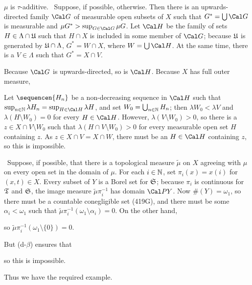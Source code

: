 {\medskip

 $\mu$ is $\tau$-additive.   \Prf\Quer\ Suppose, if
possible, otherwise.   Then there is an upwards-directed family $\Cal G$
of measurable open subsets of $X$ such that $G^*=\bigcup\Cal G$ is
measurable and $\mu G^*>\sup_{G\in\Cal G}\mu G$.   Let $\Cal H$ be the
family of sets $H\in\Lambda\cap\frak U$ such that $H\cap X$ is
included in some member of $\Cal G$;  because $\frak U$ is generated by
$\frak U\cap\Lambda$, $G^*=W\cap X$, where $W=\bigcup\Cal H$.
At the same time, there is a $V\in\Lambda$ such that $G^*=X\cap V$.

Because
$\Cal G$ is upwards-directed, so is $\Cal H$.   Because $X$ has full outer
measure,


\noindent Let $\sequencen{H_n}$ be a non-decreasing sequence in $\Cal H$
such that $\sup_{n\in\Bbb N}\lambda H_n=\sup_{H\in\Cal H}\lambda H$, and
set $W_0=\bigcup_{n\in\Bbb N}H_n$;  then $\lambda W_0<\lambda V$ and
$\lambda(H\setminus W_0)=0$ for every $H\in\Cal H$.
However, $\lambda(V\setminus W_0)>0$, so
there is a $z\in X\cap V\setminus W_0$ such that
$\lambda(H\cap V\setminus W_0)>0$ for every measurable open set $H$
containing $z$.   As $z\in X\cap V=X\cap W$,
there must be an $H\in\Cal H$ containing $z$, so this is
impossible.\ \Bang\Qed

\medskip

 \Quer\ Suppose, if possible, that there is a
topological measure $\tilde\mu$ on $X$ agreeing with $\mu$
on every open set in the domain of $\mu$.   For each $i\in\Bbb N$, set
$\pi_i(x)=x(i)$ for $(x,t)\in X$.   Every subset of $Y$ is a Borel set for
$\frak S$;  because $\pi_i$ is continuous for $\frak T$ and $\frak S$,
the image measure
$\tilde\mu\pi_i^{-1}$ has domain $\Cal PY$.   Now $\#(Y)=\omega_1$,
so there must be a countable conegligible set (419G), and there must be
some $\alpha_i<\omega_1$ such that
$\tilde\mu\pi_i^{-1}(\omega_1\setminus\alpha_i)=0$.   On the other hand,


\noindent so $\tilde\mu\pi_i^{-1}(\omega_1\setminus\{0\})=0$.

But (d-$\beta$) ensures that


\noindent so this is impossible.\ \Bang

Thus we have the required example.
}%

